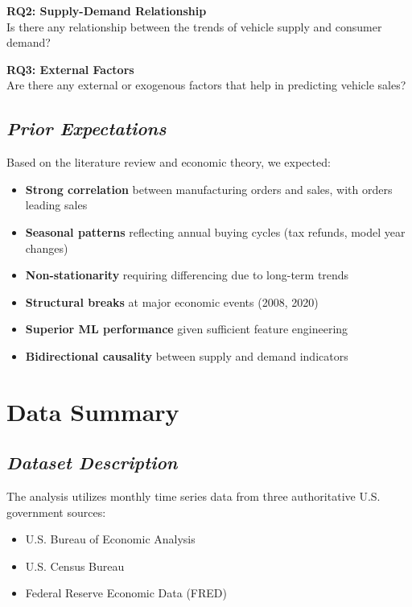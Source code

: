 \documentclass[12pt]{article}
\begin{document}
\textbf{RQ2: Supply-Demand Relationship}\\
Is there any relationship between the trends of vehicle supply and consumer demand?

\textbf{RQ3: External Factors}\\
Are there any external or exogenous factors that help in predicting vehicle sales?

\subsection*{\textit{Prior Expectations}}

Based on the literature review and economic theory, we expected:
\begin{itemize}
    \item \textbf{Strong correlation} between manufacturing orders and sales, with orders leading sales
    \item \textbf{Seasonal patterns} reflecting annual buying cycles (tax refunds, model year changes)
    \item \textbf{Non-stationarity} requiring differencing due to long-term trends
    \item \textbf{Structural breaks} at major economic events (2008, 2020)
    \item \textbf{Superior ML performance} given sufficient feature engineering
    \item \textbf{Bidirectional causality} between supply and demand indicators
\end{itemize}


\section*{\textbf{Data Summary}}

\subsection*{\textit{Dataset Description}}

The analysis utilizes monthly time series data from three authoritative U.S. government sources:
\begin{itemize}
    \item U.S. Bureau of Economic Analysis
    \item U.S. Census Bureau  
    \item Federal Reserve Economic Data (FRED)
\end{itemize}
\end{document}
